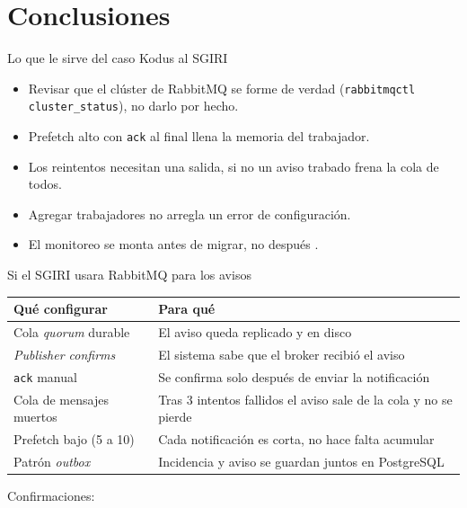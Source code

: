 \section{Conclusiones}

\begin{frame}{Lo que le sirve del caso Kodus al SGIRI}
  \begin{itemize}
    \item Revisar que el clúster de RabbitMQ se forme de verdad (\texttt{rabbitmqctl cluster\_status}), no darlo por hecho.
    \item Prefetch alto con \texttt{ack} al final llena la memoria del trabajador.
    \item Los reintentos necesitan una salida, si no un aviso trabado frena la cola de todos.
    \item Agregar trabajadores no arregla un error de configuración.
    \item El monitoreo se monta antes de migrar, no después \cite{malinosqui2026kodus}.
  \end{itemize}
\end{frame}

\begin{frame}{Si el SGIRI usara RabbitMQ para los avisos}
  \begin{tabularx}{\textwidth}{lX}
    \toprule
    Qué configurar & Para qué \\
    \midrule
    Cola \textit{quorum} durable & El aviso queda replicado y en disco \\
    \textit{Publisher confirms} & El sistema sabe que el broker recibió el aviso \\
    \texttt{ack} manual & Se confirma solo después de enviar la notificación \\
    Cola de mensajes muertos & Tras 3 intentos fallidos el aviso sale de la cola y no se pierde \\
    Prefetch bajo (5 a 10) & Cada notificación es corta, no hace falta acumular \\
    Patrón \textit{outbox} & Incidencia y aviso se guardan juntos en PostgreSQL \\
    \bottomrule
  \end{tabularx}
  \vspace{0.2cm}
  {\small Confirmaciones: \cite{rabbitmq2026confirms}}
\end{frame}

